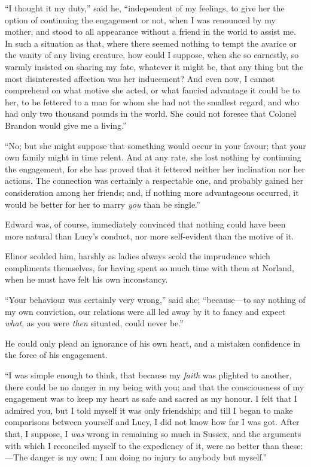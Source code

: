 \documentclass{article}
\begin{document}
``I thought it my duty,'' said he, ``independent of my feelings,
to give her the option of continuing the engagement or not,
when I was renounced by my mother, and stood to all
appearance without a friend in the world to assist me.
In such a situation as that, where there seemed nothing
to tempt the avarice or the vanity of any living creature,
how could I suppose, when she so earnestly, so warmly insisted
on sharing my fate, whatever it might be, that any thing
but the most disinterested affection was her inducement?
And even now, I cannot comprehend on what motive she acted,
or what fancied advantage it could be to her, to be
fettered to a man for whom she had not the smallest regard,
and who had only two thousand pounds in the world.
She could not foresee that Colonel Brandon would give me a
living.''

``No; but she might suppose that something would occur
in your favour; that your own family might in time relent.
And at any rate, she lost nothing by continuing the engagement,
for she has proved that it fettered neither her inclination
nor her actions.  The connection was certainly a
respectable one, and probably gained her consideration among
her friends; and, if nothing more advantageous occurred,
it would be better for her to marry \emph{you} than be single.''

Edward was, of course, immediately convinced that
nothing could have been more natural than Lucy's conduct,
nor more self-evident than the motive of it.

Elinor scolded him, harshly as ladies always scold
the imprudence which compliments themselves, for having
spent so much time with them at Norland, when he must
have felt his own inconstancy.

``Your behaviour was certainly very wrong,'' said she;
``because---to say nothing of my own conviction, our relations
were all led away by it to fancy and expect \emph{what}, as you
were \emph{then} situated, could never be.''

He could only plead an ignorance of his own heart,
and a mistaken confidence in the force of his engagement.

``I was simple enough to think, that because my \emph{faith}
was plighted to another, there could be no danger in my being
with you; and that the consciousness of my engagement was
to keep my heart as safe and sacred as my honour.  I felt
that I admired you, but I told myself it was only friendship;
and till I began to make comparisons between yourself
and Lucy, I did not know how far I was got.  After that,
I suppose, I \emph{was} wrong in remaining so much in Sussex,
and the arguments with which I reconciled myself to the
expediency of it, were no better than these:---The danger
is my own; I am doing no injury to anybody but myself.''
\end{document}

